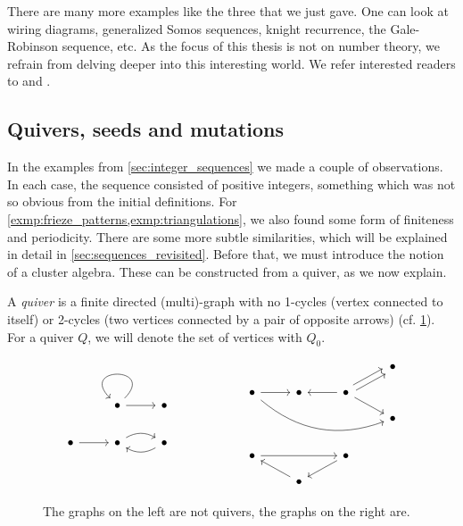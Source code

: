 There are many more examples like the three that we just gave. One can look at wiring
diagrams, generalized Somos sequences, knight recurrence, the Gale-Robinson sequence,
etc. As the focus of this thesis is not on number theory, we refrain from delving
deeper into this interesting world. We refer interested readers to \cite[Chapter
	3.4]{FominWilliams2021IntroductionCA_1-3} and \cite{FominZelevinsky2002Laurent}.

\subsection{Quivers, seeds and mutations}\label{sec:quivers_seeds_mutations}

In the examples from \cref{sec:integer_sequences} we made a couple of observations. In
each case, the sequence consisted of positive integers, something which was not so
obvious from the initial definitions. For
\cref{exmp:frieze_patterns,exmp:triangulations}, we also found some form of finiteness
and periodicity. There are some more subtle similarities, which will be explained in
detail in \cref{sec:sequences_revisited}. Before that, we must introduce the notion of
a cluster algebra. These can be constructed from a quiver, as we now explain.

\begin{definition}[Quivers]

	A \emph{quiver} is a finite directed (multi)-graph with no 1-cycles
	(vertex connected to itself) or 2-cycles (two vertices connected by a pair of opposite
	arrows) (cf. \cref{fig:quivers}). For a quiver $Q$, we will denote the set of vertices
	with $Q_0$.
\end{definition}

\begin{figure}[ht]
	\centering
	\begin{equation*}
		\begin{tikzcd}
			&\bullet \arrow[loop] \arrow[r] &\bullet \\
			\bullet \rar & \bullet \arrow[r, bend left] & \bullet \arrow[l, bend left]
		\end{tikzcd}
		\hspace{2cm}
		\begin{tikzcd}[row sep=small]
			&&& \bullet \\
			\bullet \ar[rrrd, bend right]\rar &\bullet  \rar[leftarrow] &\bullet \ar[ru, shift left] \ar[ru, shift right] \ar[rd] \\
			&&& \bullet\\
			\\
			\bullet \ar[rr] && \bullet \ar[ld]\\
			& \bullet \ar[lu]
		\end{tikzcd}
	\end{equation*}
	\caption{The graphs on the left are not quivers, the graphs on the right are.}
	\label{fig:quivers}
\end{figure}

